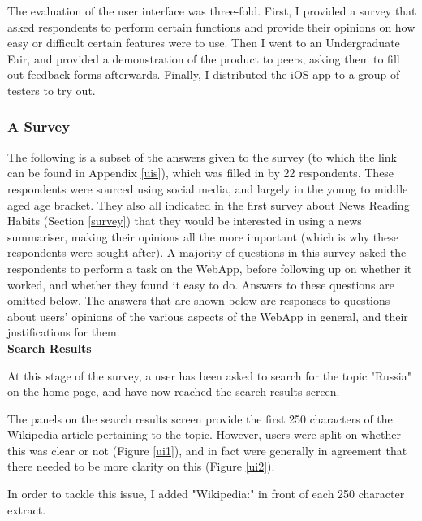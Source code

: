 \documentclass[12pt]{article}
\begin{document}
The evaluation of the user interface was three-fold. First, I provided a survey that asked respondents to perform certain functions and provide their opinions on how easy or difficult certain features were to use. Then I went to an Undergraduate Fair, and provided a demonstration of the product to peers, asking them to fill out feedback forms afterwards. Finally, I distributed the iOS app to a group of testers to try out. 

\subsubsection{A Survey}

\label{uisurvey}

The following is a subset of the answers given to the survey (to which the link can be found in Appendix \ref{uis}), which was filled in by 22 respondents. These respondents were sourced using social media, and largely in the young to middle aged age bracket. They also all indicated in the first survey about News Reading Habits (Section \ref{survey}) that they would be interested in using a news summariser, making their opinions all the more important (which is why these respondents were sought after). A majority of questions in this survey asked the respondents to perform a task on the WebApp, before following up on whether it worked, and whether they found it easy to do. Answers to these questions are omitted below. The answers that are shown below are responses to questions about users' opinions of the various aspects of the WebApp in general, and their justifications for them. \\

\textbf{Search Results}

At this stage of the survey, a user has been asked to search for the topic "Russia" on the home page, and have now reached the search results screen.

The panels on the search results screen provide the first 250 characters of the Wikipedia article pertaining to the topic. However, users were split on whether this was clear or not (Figure \ref{ui1}), and in fact were generally in agreement that there needed to be more clarity on this (Figure \ref{ui2}). 

In order to tackle this issue, I added "Wikipedia:" in front of each 250 character extract. \\
\end{document}
